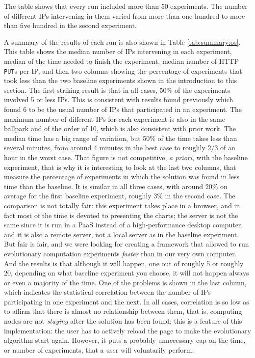 \documentclass[journal,onecolumn]{IEEEtran}
\begin{document}
%
The table shows that every run included more than 50 experiments. The %
number of different IPs intervening in them varied from more than one
hundred to more than five hundred in the second experiment.

A summary of the results of each run is also shown in Table
\ref{tab:summary:os}. This table shows the median number of IPs
intervening in each experiment,  median of the time needed
to finish the experiment, median number of HTTP {\tt PUT}s per IP, and
then two columns showing the percentage of experiments that took less
than the two baseline experiments shown in the introduction to this
section. The first striking result is that in all cases, 50\% of the
experiments involved 5 or less IPs. This is consistent with results
found previously \cite{DBLP:conf/gecco/GuervosG15} which found 6 to be
the usual number of IPs that participated in an experiment. The
maximum number of different IPs for each experiment is also in the
same ballpark and of the order of 10, which is also consistent with
prior work. The median time has a big range of variation, but 50\% of
the time takes less than several minutes, from around 4 minutes in the
best case to roughly 2/3 of an hour in the worst case. That figure is
not competitive, {\em a priori}, with the baseline experiment, that is
why it is interesting to look at the last two columns, that measure
the percentage of experiments in which the solution was found in less
time than the baseline. It is similar in all three cases, with around
20\% on average for the first baseline experiment, roughly 3\% in the
second case. The comparison is not totally fair: this experiment takes
place in a browser, and in fact most of the time is devoted to
presenting the charts; the server is not the same since it is run in a
PaaS instead of a high-performance desktop computer, and it is also a
remote server, not a local server as in the baseline experiment. But
fair is fair, and we were looking for creating a framework that
allowed to run evolutionary computation experiments {\em faster} than
in our very own computer. And the results is that although it will
happen, one out of roughly 5 or roughly 20, depending on what baseline %
experiment you choose, it will not happen always or even a majority of
the time. One of the problems is shown in the last column, which
indicates the statistical correlation between the number of IPs
participating in one experiment and the next. In all cases,
correlation is so low as to affirm that there is almost no
relationship between them, that is, computing nodes are not {\em
  staying} after the solution has been found; this is a feature of
this implementation: the user has to actively reload the page to make
the evolutionary algorithm start again. However, it puts a probably
unnecessary cap on the time, or number of experiments, that a user %
will voluntarily perform.
\end{document}
